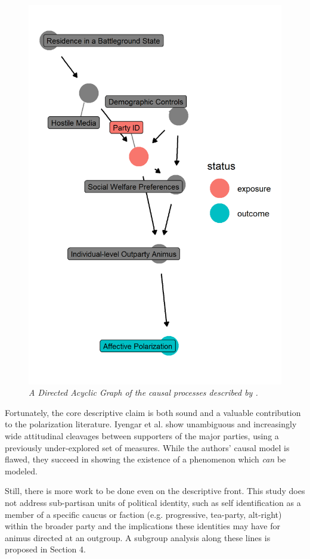 \documentclass[12pt]{article}
\begin{document}
\begin{figure}[h!]
\center\includegraphics[width=6in]{ext-dag.png}
\caption{\label{fig:dag}\textit{A Directed Acyclic Graph of the causal processes described by \citeauthor{iyengar2012affect}.}}
\end{figure}

Fortunately, the core descriptive claim is both sound and a valuable contribution to the polarization literature. Iyengar et al. show unambiguous and increasingly wide attitudinal cleavages between supporters of the major parties, using a previously under-explored set of measures. While the authors' causal model is flawed, they succeed in showing the existence of a phenomenon which \textit{can} be modeled.

Still, there is more work to be done even on the descriptive front. This study does not address sub-partisan units of political identity, such as self identification as a member of a specific caucus or faction (e.g. progressive, tea-party, alt-right) within the broader party and the implications these identities may have for animus directed at an outgroup. A subgroup analysis along these lines is proposed in Section 4.
\end{document}
